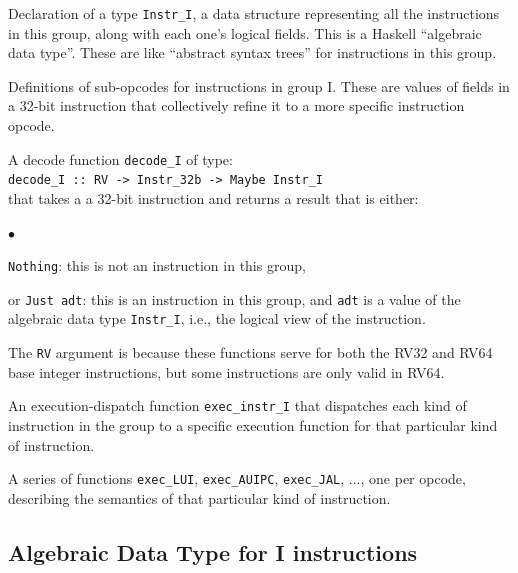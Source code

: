 \documentclass[11pt]{article}
\newcommand{\hmm}{\hspace*{2em}}
\newenvironment{tightlist}%
{\begin{list}{$\bullet$}{%
    \setlength{\topsep}{0in}
    \setlength{\partopsep}{0in}
    \setlength{\itemsep}{0in}
    \setlength{\parsep}{0in}
    \setlength{\leftmargin}{1.5em}
    \setlength{\rightmargin}{0in}
    \setlength{\itemindent}{0in}
}
}%
{\end{list}
}
\begin{document}
\begin{itemize}

\item Declaration of a type \verb|Instr_I|, a data structure
representing all the instructions in this group, along with each one's
logical fields.  This is a Haskell ``algebraic data type''.  These are
like ``abstract syntax trees'' for instructions in this group.

\item Definitions of sub-opcodes for instructions in group I.  These
are values of fields in a 32-bit instruction that collectively refine
it to a more specific instruction opcode.

\item A decode function \verb|decode_I| of type: \\
\hmm \verb|decode_I :: RV -> Instr_32b -> Maybe Instr_I| \\
that takes a a 32-bit instruction and returns a result that is either:
  \begin{tightlist}

    \item \verb|Nothing|: this is not an instruction in this group,

    \item or \verb|Just adt|: this is an instruction in this group,
    and \verb|adt| is a value of the algebraic data type
    \verb|Instr_I|, i.e., the logical view of the instruction.

  \end{tightlist}
  The \verb|RV| argument is because these functions serve for both the
  RV32 and RV64 base integer instructions, but some instructions are
  only valid in RV64.

\item An execution-dispatch function \verb|exec_instr_I| that
dispatches each kind of instruction in the group to a specific
execution function for that particular kind of instruction.

\item A series of functions \verb|exec_LUI|, \verb|exec_AUIPC|,
\verb|exec_JAL|, ..., one per opcode, describing the semantics of that
particular kind of instruction.

\end{itemize}


\subsection{Algebraic Data Type for I instructions}
\end{document}
